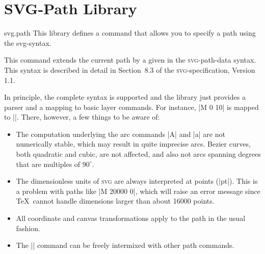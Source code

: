 %
%
%


\section{SVG-Path Library}
\label{section-library-svg-path}

\begin{pgflibrary}{svg.path}
  This library defines a command that allows you to specify a path
  using the svg-syntax.
\end{pgflibrary}

\begin{command}{\pgfpathsvg{}}
  This command extends the current path by a  given in the
  \textsc{svg}-path-data syntax. This syntax is described in detail in
  Section~8.3 of the \textsc{svg}-specification, Version 1.1. 

  In principle, the complete syntax is supported and the library just
  provides a parser and a mapping to basic layer commands. For
  instance, |M 0 10| is mapped to
  |\pgfpathmoveto{\pgfpoint{0pt}{10pt}}|. There, however, a few things
  to be aware of:
  \begin{itemize}
  \item The computation underlying the arc commands |A| and |a|
    are not numerically stable, which may result in quite imprecise
    arcs. B\´ezier curves, both quadratic and cubic, are not affected,
    and also not arcs spanning degrees that are multiples of
    $90^\circ$.
  \item The dimensionless units of \textsc{svg} are always interpreted
    at points (|pt|). This is a problem with paths like |M 20000 0|,
    which will raise an error message since \TeX\ cannot handle
    dimensions larger than about 16000 points.
  \item
    All coordinate and canvas transformations apply to the path in the
    usual fashion.
  \item
    The |\pgfpathsvg| command can be freely intermixed with other path
    commands. 
  \end{itemize}
\begin{codeexample}[]
\begin{pgfpicture}
\end{pgfpicture}
\end{codeexample}
\end{command}

